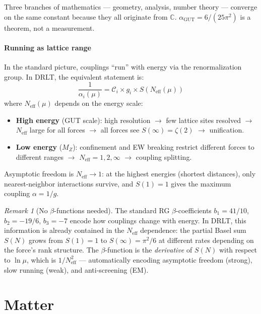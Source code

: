 \documentclass[12pt]{article}
\theoremstyle{remark}
\newtheorem{remark}[theorem]{Remark}
\theoremstyle{definition}
\begin{document}
Three branches of mathematics --- geometry, analysis, number theory --- converge on the same constant because they all originate from $\mathbb{C}$. $\alpha_\text{GUT} = 6/(25\pi^2)$ is a theorem, not a measurement.

\subsection{Running as lattice range}

In the standard picture, couplings ``run'' with energy via the renormalization group. In DRLT, the equivalent statement is:
\begin{equation}
\frac{1}{\alpha_i(\mu)} = \mathcal{C}_i \times g_i \times S\!\left(N_\text{eff}(\mu)\right)
\end{equation}
where $N_\text{eff}(\mu)$ depends on the energy scale:

\begin{itemize}
\item \textbf{High energy} (GUT scale): high resolution $\to$ few lattice sites resolved $\to$ $N_\text{eff}$ large for all forces $\to$ all forces see $S(\infty) = \zeta(2)$ $\to$ unification.
\item \textbf{Low energy} ($M_Z$): confinement and EW breaking restrict different forces to different ranges $\to$ $N_\text{eff} = 1, 2, \infty$ $\to$ coupling splitting.
\end{itemize}

Asymptotic freedom is $N_\text{eff} \to 1$: at the highest energies (shortest distances), only nearest-neighbor interactions survive, and $S(1) = 1$ gives the maximum coupling $\alpha = 1/g$.

\begin{remark}[No $\beta$-functions needed]
The standard RG $\beta$-coefficients $b_1 = 41/10$, $b_2 = -19/6$, $b_3 = -7$ encode how couplings change with energy. In DRLT, this information is already contained in the $N_\text{eff}$ dependence: the partial Basel sum $S(N)$ grows from $S(1) = 1$ to $S(\infty) = \pi^2/6$ at different rates depending on the force's rank structure. The $\beta$-function is the \emph{derivative} of $S(N)$ with respect to $\ln\mu$, which is $1/N_\text{eff}^2$ --- automatically encoding asymptotic freedom (strong), slow running (weak), and anti-screening (EM).
\end{remark}


\part{Matter}
\end{document}
